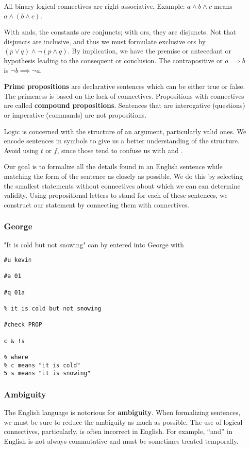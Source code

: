 \documentclass[12pt]{article}
\begin{document}
All binary logical connectives are right associative. Example: $a \land b \land c$ means $a \land (b \land c)$.

With ands, the constants are conjuncts; with ors, they are disjuncts. Not that disjuncts are inclusive, and thus we must formulate exclusive ors by $(p \lor q) \land \neg (p \land q)$. By implication, we have the premise or antecedant or hypothesis leading to the consequent or conclusion. The contrapositive or $a \implies b$ is $\neg b \implies \neg a$.

{\bf Prime propositions} are declarative sentences which can be either true or false. The primeness is based on the lack of connectives. Propositions with connectives are called {\bf compound propositions}. Sentences that are interogative (questions) or imperative (commands) are not propositions.

Logic is concerned with the structure of an argument, particularly valid ones. We encode sentences in symbols to give us a better understanding of the structure. Avoid using $t$ or $f$, since those tend to confuse us with \true and \false .

Our goal is to formalize all the details found in an English sentence while matching the form of the sentence as closely as possible. We do this by selecting the smallest statements without connectives about which we can can determine validity. Using propositional letters to stand for each of these sentences, we construct our statement by connecting them with connectives.

\subsubsection*{George}
"It is cold but not snowing" can by entered into George with

\begin{verbatim}
#u kevin

#a 01

#q 01a

% it is cold but not snowing

#check PROP

c & !s

% where
% c means "it is cold"
5 s means "it is snowing"
\end{verbatim}

\subsubsection*{Ambiguity}
The English language is notorious for {\bf ambiguity}. When formalizing sentences, we must be sure to reduce the ambiguity as much as possible. The use of logical connectives, particularly, is often incorrect in English. For example, ``and'' in English is not always commutative and must be sometimes treated temporally.
\end{document}
